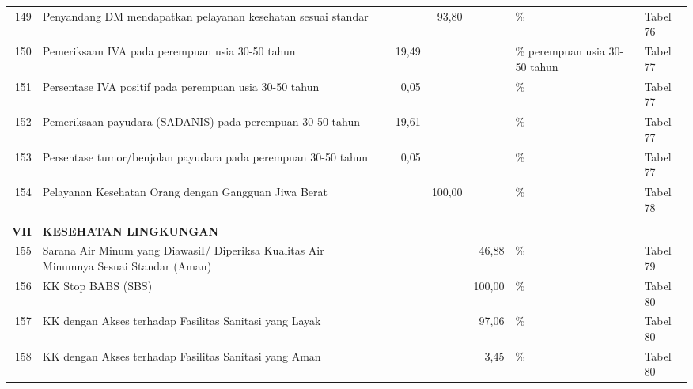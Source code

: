 \begin{small}
\begin{longtable}{rY{12em}rrrrY{5em}Y{5em}}
	149 & Penyandang DM  mendapatkan pelayanan kesehatan sesuai standar               &        &        &              93,80 &          & \%                             & Tabel 76 \\
	150 & Pemeriksaan IVA pada perempuan usia 30-50 tahun                             &        &  19,49 &                    &          & \% perempuan usia 30-50 tahun  & Tabel 77 \\
	151 & Persentase IVA positif pada perempuan usia 30-50 tahun                      &        &   0,05 &                    &          & \%                             & Tabel 77 \\
	152 & Pemeriksaan payudara (SADANIS) pada perempuan 30-50 tahun                   &        &  19,61 &                    &          & \%                             & Tabel 77 \\
	153 & Persentase tumor/benjolan payudara pada perempuan 30-50 tahun               &        &   0,05 &                    &          & \%                             & Tabel 77 \\
	154 & Pelayanan Kesehatan Orang dengan Gangguan Jiwa Berat                        &        &        &             100,00 &          & \%                             & Tabel 78 \\
	&                                                                                 &        &        &                    &          &                                &          \\ 
	 \textbf{VII} & \textbf{KESEHATAN LINGKUNGAN}                                     &        &        &                    &          &                                &          \\
	155 & Sarana Air Minum yang DiawasiI/ Diperiksa Kualitas Air Minumnya Sesuai Standar (Aman)&   &    &                    &    46,88 & \%                             & Tabel 79 \\
	156 & KK Stop BABS (SBS)                                                          &        &        &                    &   100,00 & \%                             & Tabel 80 \\
	157 & KK dengan Akses terhadap Fasilitas Sanitasi yang Layak                      &        &        &                    &    97,06 & \%                             & Tabel 80 \\
	158 & KK dengan Akses terhadap Fasilitas Sanitasi yang Aman                       &        &        &                    &     3,45 & \%                             & Tabel 80 \\

\end{longtable}
\end{small}
